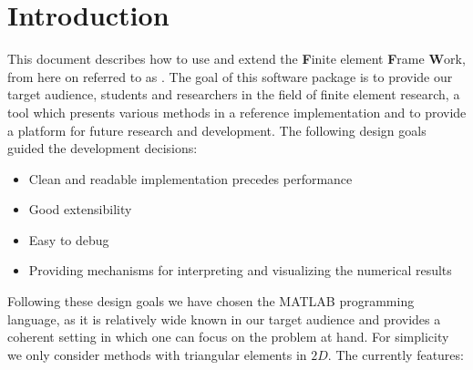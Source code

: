 \section{Introduction}

\noindent This document describes how to use and extend the \textbf{F}inite
element \textbf{F}rame \textbf{W}ork, from here on referred to as
\FFW. The goal of this software package is to provide our target
audience, students and researchers in the field of finite element
research, a tool which presents various methods in a reference
implementation and to provide a platform for future research and development. The
following design goals guided the development decisions:
\begin{itemize}
    \item{Clean and readable implementation precedes performance}
    \item{Good extensibility}
    \item{Easy to debug}
    \item{Providing mechanisms for interpreting and visualizing the numerical results}
\end{itemize}
Following these design goals we have chosen the MATLAB programming
language, as it is relatively wide known in our target audience and
provides a coherent setting in which one can focus on the problem at
hand. For simplicity we only consider methods with triangular
elements in $2D$. The \FFW currently features:
